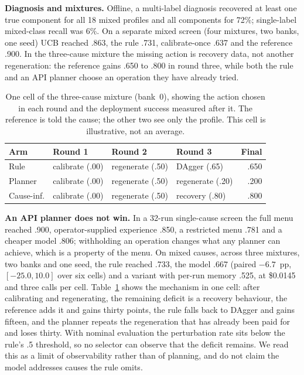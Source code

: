 \documentclass[conference]{IEEEtran}
\begin{document}
\textbf{Diagnosis and mixtures.} Offline, a multi-label diagnosis recovered at least one true component for all 18 mixed profiles and all components for 72\%; single-label mixed-class recall was 6\%. On a separate mixed screen (four mixtures, two banks, one seed) UCB reached .863, the rule .731, calibrate-once .637 and the reference .900. In the three-cause mixture the missing action is recovery data, not another regeneration: the reference gains .650 to .800 in round three, while both the rule and an API planner choose an operation they have already tried.

\begin{table}[t]
\centering\caption{One cell of the three-cause mixture (bank~0), showing the action chosen in each round and the deployment success measured after it. The reference is told the cause; the other two see only the profile. This cell is illustrative, not an average.}\label{tab:chains}
\setlength{\tabcolsep}{3.6pt}
\begin{tabular}{@{}llllr@{}}\toprule
Arm & Round 1 & Round 2 & Round 3 & Final\\\midrule
Rule & calibrate (.00) & regenerate (.50) & DAgger (.65) & .650\\
Planner & calibrate (.00) & regenerate (.50) & regenerate (.20) & .200\\
Cause-inf. & calibrate (.00) & regenerate (.50) & recovery (.80) & .800\\\bottomrule
\end{tabular}
\end{table}
\textbf{An API planner does not win.} In a 32-run single-cause screen the full menu reached .900, operator-supplied experience .850, a restricted menu .781 and a cheaper model .806; withholding an operation changes what any planner can achieve, which is a property of the menu. On mixed causes, across three mixtures, two banks and one seed, the rule reached .733, the model .667 (paired $-6.7$~pp, $[-25.0,10.0]$ over six cells) and a variant with per-run memory .525, at \$0.0145 and three calls per cell. Table~\ref{tab:chains} shows the mechanism in one cell: after calibrating and regenerating, the remaining deficit is a recovery behaviour, the reference adds it and gains thirty points, the rule falls back to DAgger and gains fifteen, and the planner repeats the regeneration that has already been paid for and loses thirty. With nominal evaluation the perturbation rate sits below the rule's .5 threshold, so no selector can observe that the deficit remains. We read this as a limit of observability rather than of planning, and do not claim the model addresses causes the rule omits.
\end{document}
